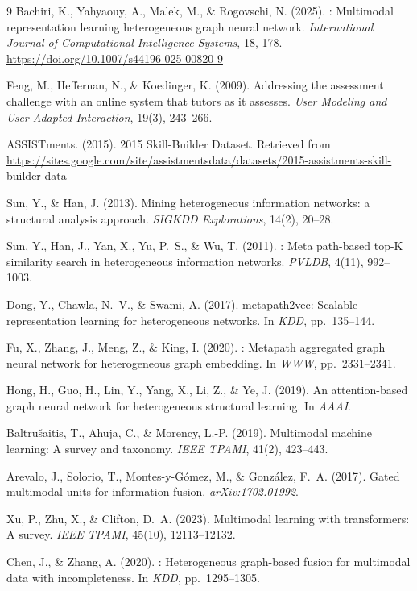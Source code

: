 \documentclass[sigconf]{acmart}
\begin{document}
\begin{thebibliography}{9}
Bachiri, K., Yahyaouy, A., Malek, M., \& Rogovschi, N.
  (2025).
: Multimodal representation learning
  heterogeneous graph neural network.
\newblock \emph{International Journal of Computational
  Intelligence Systems}, 18, 178.
\newblock \url{https://doi.org/10.1007/s44196-025-00820-9}

Feng, M., Heffernan, N., \& Koedinger, K. (2009).
\newblock Addressing the assessment challenge with an online system that tutors
  as it assesses.
\newblock \emph{User Modeling and User-Adapted Interaction}, 19(3), 243--266.

ASSISTments. (2015).
 2015 Skill-Builder Dataset.
\newblock Retrieved from
  \url{https://sites.google.com/site/assistmentsdata/datasets/2015-assistments-skill-builder-data}

Sun, Y., \& Han, J. (2013).
\newblock Mining heterogeneous information networks:
  a structural analysis approach.
\newblock \emph{SIGKDD Explorations}, 14(2), 20--28.

Sun, Y., Han, J., Yan, X., Yu, P.~S., \& Wu, T. (2011).
: Meta path-based top-K similarity
  search in heterogeneous information networks.
\newblock \emph{PVLDB}, 4(11), 992--1003.

Dong, Y., Chawla, N.~V., \& Swami, A. (2017).
\newblock metapath2vec: Scalable representation
  learning for heterogeneous networks.
\newblock In \emph{KDD}, pp.\ 135--144.

Fu, X., Zhang, J., Meng, Z., \& King, I. (2020).
: Metapath aggregated graph neural
  network for heterogeneous graph embedding.
\newblock In \emph{WWW}, pp.\ 2331--2341.

Hong, H., Guo, H., Lin, Y., Yang, X., Li, Z.,
  \& Ye, J. (2019).
\newblock An attention-based graph neural network
  for heterogeneous structural learning.
\newblock In \emph{AAAI}.

Baltru\v{s}aitis, T., Ahuja, C., \& Morency, L.-P.
  (2019).
\newblock Multimodal machine learning: A survey and
  taxonomy.
\newblock \emph{IEEE TPAMI}, 41(2), 423--443.

Arevalo, J., Solorio, T., Montes-y-G{\'o}mez, M.,
  \& Gonz{\'a}lez, F.~A. (2017).
\newblock Gated multimodal units for information fusion.
\newblock \emph{arXiv:1702.01992}.

Xu, P., Zhu, X., \& Clifton, D.~A. (2023).
\newblock Multimodal learning with transformers:
  A survey.
\newblock \emph{IEEE TPAMI}, 45(10), 12113--12132.

Chen, J., \& Zhang, A. (2020).
: Heterogeneous graph-based fusion
  for multimodal data with incompleteness.
\newblock In \emph{KDD}, pp.\ 1295--1305.

\end{thebibliography}
\end{document}

